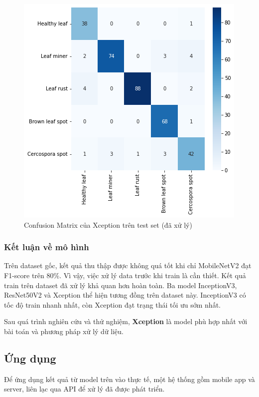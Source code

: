 \documentclass[a4paper,14pt]{extarticle}
\begin{document}
		\begin{figure}[H]
			\centering
			\includegraphics[scale=0.8]{images/xception_matrix.png}
			\caption{Confusion Matrix của Xception trên test set (đã xử lý)}
		\end{figure}

		\subsubsection{Kết luận về mô hình}

		Trên dataset gốc, kết quả thu thập được không quá tốt khi chỉ MobileNetV2 đạt F1-score trên 80\%. Vì vậy, việc xử lý data trước khi train là cần thiết. Kết quả train trên dataset đã xử lý khả quan hơn hoàn toàn. Ba model InceptionV3, ResNet50V2 và Xception thể hiện tương đồng trên dataset này. InceptionV3 có tốc độ train nhanh nhất, còn Xception đạt trạng thái tối ưu sớm nhất.

		Sau quá trình nghiên cứu và thử nghiệm, \textbf{Xception} là model phù hợp nhất với bài toán và phương pháp xử lý dữ liệu.

	\subsection{Ứng dụng}
	Để ứng dụng kết quả từ model trên vào thực tế, một hệ thống gồm mobile app và server, liên lạc qua API để xử lý đã được phát triển.
\end{document}
